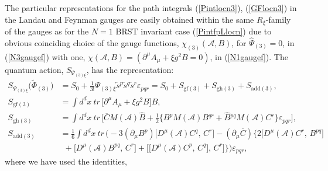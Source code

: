 \documentclass[10pt]{article}
\begin{document}
 The particular representations for the path integrals (\ref{Pintlocn3}), (\ref{GFlocn3}) in  the Landau and Feynman gauges are easily obtained within the same $R_\xi$-family of the gauges as for the $N=1$ BRST invariant case (\ref{PintfpLlocn}) due to obvious coinciding choice of the gauge functions, $\chi_{(3)}(\mathcal{A},B)$, for  $\widehat{\Psi}_{(3)}=0$, in (\ref{N3gaugef}) with  one, $\chi(\mathcal{A},B)=(\partial^\mu A_{\mu}+\xi g^2 B=0) $, in (\ref{N1gaugef}). The quantum action, $S_{\Psi_{(3)\xi}}$, has the representation:
\begin{align}\label{qexi3}
  S_{\Psi_{(3)\xi}}\big(\widetilde{\Phi}_{(3)}\big) & = S_0+\frac{1}{3!}%
\Psi_{(3)\xi}\overleftarrow{s}{}^p\overleftarrow{s}{}^q\overleftarrow{s}{}^r \varepsilon_{pqr}= S_0+S_{\mathrm{gf}(3)} +  S_{\mathrm{gh}(3)}+  S_{\mathrm{add}(3)} ,\\
 S_{\mathrm{gf}(3)} &  =  \int d^{d}x\ tr\, \Big[    \partial^{\mu}A_{\mu
}  + {\xi g^2} B\Big]  B,
\label{gfxi3}\\
   S_{\mathrm{gh}(3)}&  = \int d^{d}x\ tr\, \Big[ %
 \overline{C}M(\mathcal{A}) \widehat{B}   +\frac{1}{2} \big\{B^pM(\mathcal{A}) {B}{}^{qr}  +\widehat{B}{}^{pq}M(\mathcal{A}) {C}{}^{r}\big\}\varepsilon_{pqr}\Big], \label{ghxi3} \\
 S_{\mathrm{add}(3)} &= \frac{1 }{ 6}\int d^{d}x \ tr\,  \Big(-3(\partial_\mu B^p) \big[D^\mu(\mathcal{A}) C^q,\, C^r\big] -  (\partial_\mu \overline{C}) \Big\{ 2 \big[D^\mu(\mathcal{A}) C^r,\, B^{pq}\big]      \nonumber \\
 \phantom{ S_{add(3)}} & \ \  +  \big[D^\mu(\mathcal{A}) B^{pq},\,C^r \big] +\big[\big[D^\mu(\mathcal{A}) C^p,\,  C^q\big] ,\,C^r\big] \Big\} \Big)   \varepsilon_{pqr} , \label{addxi3}
\end{align}
where we have used the identities,
\end{document}
